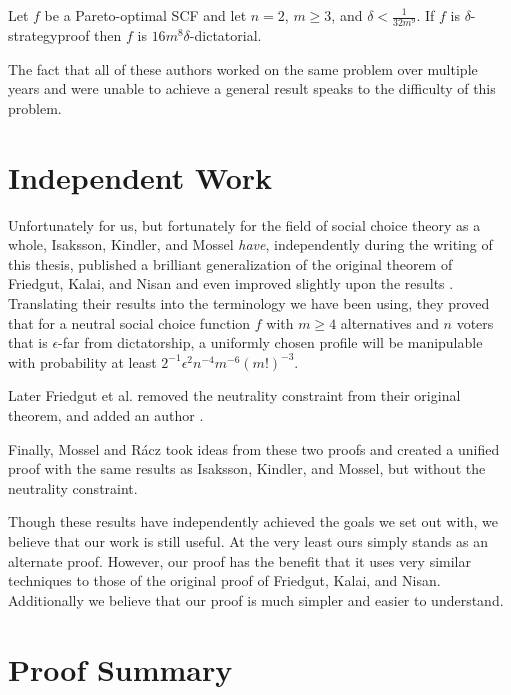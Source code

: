 	\begin{theorem}
		Let $f$ be a Pareto-optimal SCF and let $n = 2$, $m \ge 3$, and $\delta < \frac{1}{32m^9}$. If $f$ is $\delta$-strategyproof then $f$ is $16m^8 \delta$-dictatorial.
	\end{theorem}

	The fact that all of these authors worked on the same problem over multiple years and were unable to achieve a general result speaks to the difficulty of this problem.


\section{Independent Work}


	Unfortunately for us, but fortunately for the field of social choice theory as a whole, Isaksson, Kindler, and Mossel \emph{have}, independently during the writing of this thesis, published a brilliant generalization of the original theorem of Friedgut, Kalai, and Nisan and even improved slightly upon the results \cite{isaksson2010geometry}. Translating their results into the terminology we have been using, they proved that for a neutral social choice function $f$ with $m \ge 4$ alternatives and $n$ voters that is $\epsilon$-far from dictatorship, a uniformly chosen profile will be manipulable with probability at least $2^{-1} \epsilon^2 n^{-4} m^{-6} (m!)^{-3}$.

	Later Friedgut et al. removed the neutrality constraint from their original theorem, and added an author \cite{friedgut2011quantitative}.

	Finally, Mossel and R\'{a}cz \cite{mossel2011quantitative} took ideas from these two proofs and created a unified proof with the same results as Isaksson, Kindler, and Mossel, but without the neutrality constraint.

	Though these results have independently achieved the goals we set out with, we believe that our work is still useful. At the very least ours simply stands as an alternate proof. However, our proof has the benefit that it uses very similar techniques to those of the original proof of Friedgut, Kalai, and Nisan. Additionally we believe that our proof is much simpler and easier to understand.


\section {Proof Summary}

